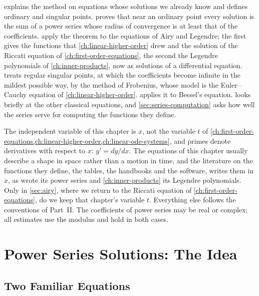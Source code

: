  explains the method on equations whose solutions we already know and defines ordinary and singular points.  proves that near an ordinary point every solution is the sum of a power series whose radius of convergence is at least that of the coefficients.  apply the theorem to the equations of Airy and Legendre; the first gives the functions that \cref{ch:linear-higher-order} drew and the solution of the Riccati equation of \cref{ch:first-order-equations}, the second the Legendre polynomials of \cref{ch:inner-products}, now as solutions of a differential equation.  treats regular singular points, at which the coefficients become infinite in the mildest possible way, by the method of Frobenius, whose model is the Euler--Cauchy equation of \cref{ch:linear-higher-order}.  applies it to Bessel's equation.  looks briefly at the other classical equations, and \cref{sec:series-computation} asks how well the series serve for computing the functions they define.

The independent variable of this chapter is $x$, not the variable $t$ of \cref{ch:first-order-equations,ch:linear-higher-order,ch:linear-ode-systems}, and primes denote derivatives with respect to $x$: $y'=dy/dx$. The equations of this chapter usually describe a shape in space rather than a motion in time, and the literature on the functions they define, the tables, the handbooks and the software, writes them in $x$, as  wrote its power series and \cref{ch:inner-products} its Legendre polynomials. Only in \cref{sec:airy}, where we return to the Riccati equation of \cref{ch:first-order-equations}, do we keep that chapter's variable $t$. Everything else follows the conventions of Part~II. The coefficients of power series may be real or complex; all estimates use the modulus and hold in both cases.

\section{Power Series Solutions: The Idea}
\label{sec:series-idea}

\subsection{Two Familiar Equations}


